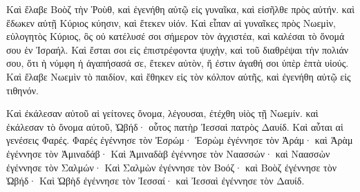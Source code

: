 {\par }{\PP {}Καὶ ἔλαβε Βοὸζ τὴν Ῥοὺθ, καὶ ἐγενήθη αὐτῷ εἰς γυναῖκα, καὶ εἰσῆλθε πρὸς αὐτήν. καὶ ἔδωκεν αὐτῇ Κύριος κύησιν, καὶ ἔτεκεν υἱόν.
Καὶ εἶπαν αἱ γυναῖκες πρὸς Νωεμὶν, εὐλογητὸς Κύριος, ὃς οὐ κατέλυσέ σοι σήμερον τὸν ἀγχιστέα, καὶ καλέσαι τὸ ὄνομά σου ἑν Ἰσραήλ.
Καὶ ἔσται σοι εἰς ἐπιστρέφοντα ψυχὴν, καὶ τοῦ διαθρέψαι τὴν πολιάν σου, ὅτι ἡ νύμφη ἡ ἀγαπήσασά σε, ἔτεκεν αὐτὸν, ἥ ἐστιν ἀγαθή σοι ὑπὲρ ἑπτὰ υἱούς.
Καὶ ἔλαβε Νωεμὶν τὸ παιδίον, καὶ ἔθηκεν εἰς τὸν κόλπον αὐτῆς, καὶ ἐγενήθη αὐτῷ εἰς τιθηνόν.
\par }{\PP {}Καὶ ἐκάλεσαν αὐτοῦ αἱ γείτονες ὄνομα, λέγουσαι, ἐτέχθη υἱὸς τῇ Νωεμίν. καὶ ἐκάλεσαν τὸ ὄνομα αὐτοῦ, Ὠβήδ· οὗτος πατὴρ Ἰεσσαὶ πατρὸς Δαυίδ.
Καὶ αὗται αἱ γενέσεις Φαρές. Φαρές ἐγέννησε τὸν Ἐσρώμ·
Ἐσρὼμ ἐγέννησε τὸν Ἀράμ· καὶ Ἀρὰμ ἐγέννησε τὸν Ἀμιναδάβ·
Καὶ Ἀμιναδὰβ ἐγέννησε τὸν Ναασσών· καὶ Ναασσὼν ἐγέννησε τὸν Σαλμών·
Καὶ Σαλμὼν ἐγέννησε τὸν Βοόζ· καὶ Βοὸζ ἐγέννησε τὸν Ὠβήδ·
Καὶ Ὡβὴδ ἐγέννησε τὸν Ἰεσσαί· καὶ Ἰεσσαὶ ἐγέννησε τὸν Δαυίδ.
\par }